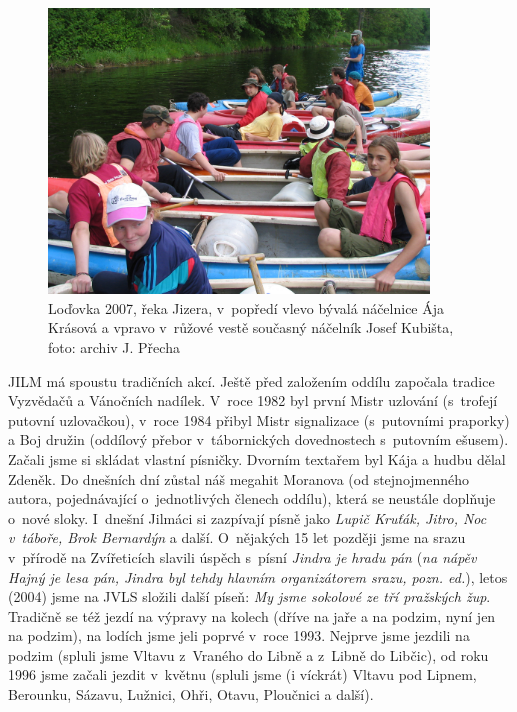 \documentclass[a5paper, 11pt, twoside]{article}
\begin{document}
\begin{figure}[h]
  \centering 
  \includegraphics[width=0.9\textwidth]{img/79_lodovka.JPG}
  \caption*{Loďovka 2007, řeka Jizera, v~popředí vlevo bývalá náčelnice Ája
  Krásová a vpravo v~růžové vestě současný náčelník Josef Kubišta, foto:
  archiv J. Přecha}
\end{figure}

JILM má spoustu tradičních akcí. Ještě před založením oddílu započala
tradice Vyzvědačů a Vánočních nadílek. V~roce 1982 byl první Mistr
uzlování (s~trofejí putovní uzlovačkou), v~roce 1984 přibyl Mistr
signalizace (s~putovními praporky) a Boj družin (oddílový přebor
v~tábornických dovednostech s~putovním ešusem). Začali jsme si skládat
vlastní písničky. Dvorním textařem byl Kája a hudbu dělal Zdeněk. Do
dnešních dní zůstal náš megahit Moranova (od stejnojmenného autora,
pojednávající o~jednotlivých členech oddílu), která se neustále doplňuje
o~nové sloky. I~dnešní Jilmáci si zazpívají písně jako \textit{Lupič
Kruťák, Jitro, Noc v~táboře, Brok Bernardýn} a další. O~nějakých 15 let
později jsme na srazu v~přírodě na Zvířeticích slavili úspěch s~písní
\textit{Jindra je hradu pán} (\textit{na nápěv Hajný je lesa pán, Jindra byl
tehdy hlavním organizátorem srazu, pozn. ed.}), letos (2004) jsme na
JVLS složili další píseň: \textit{My jsme sokolové ze tří pražských žup}.
Tradičně se též jezdí na výpravy na kolech (dříve na jaře a na podzim,
nyní jen na podzim), na lodích jsme jeli poprvé v~roce 1993. Nejprve
jsme jezdili na podzim (spluli jsme Vltavu z~Vraného do Libně a z~Libně
do Libčic), od roku 1996 jsme začali jezdit v~květnu (spluli jsme (i
víckrát) Vltavu pod Lipnem, Berounku, Sázavu, Lužnici, Ohři, Otavu,
Ploučnici a další).
\end{document}
